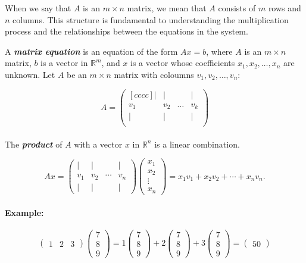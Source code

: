 \documentclass[a4paper,12pt]{article}
\begin{document}
When we say that \( A \) is an \( m \times n \) matrix, we mean that \( A \) consists of \( m \) rows and \( n \) columns. This structure is fundamental to understanding the multiplication process and the relationships between the equations in the system.
\begin{tcolorbox}[title=Definition,colframe=blue!70!black, colback=blue!5!white]
A \textbf{\textit{matrix equation}} is an equation of the form \(Ax = b\), where \(A\) is an \(m \times n\) matrix, \(b\) is a vector in \(\mathbb{R}^m\), and \(x\) is a vector whose coefficients \(x_1, x_2,\dots, x_n\) are unknown.
Let \(A\) be an \(m \times n\) matrix with coloumns \(v_1, v_2,\dots, v_n\):

\begin{equation} A =
  \begin{pmatrix}[cccc]
   | & | &  & | \\
   v_1 & v_2 & \dots & v_k \\
   | & | &  & |\\
\end{pmatrix}
\end{equation}
 \\
The \textit{\textbf{product}} of \(A\) with a vector \(x\) in \(\mathbb{R}^n\) is a linear combination.

\[
Ax =
\begin{pmatrix}
\vert & \vert & & \vert \\
v_1 & v_2 & \cdots & v_n \\
\vert & \vert & & \vert
\end{pmatrix}
\begin{pmatrix}
x_1 \\
x_2 \\
\vdots \\
x_n
\end{pmatrix}
=
x_1v_1 + x_2v_2 + \cdots + x_nv_n.
\]
\end{tcolorbox}
\paragraph{Example:}

\[
\begin{pmatrix}
1 & 2 & 3
\end{pmatrix}
 \begin{pmatrix}
7 \\
8 \\
9 
\end{pmatrix}  
=
1
 \begin{pmatrix}
7 \\
8 \\
9 
\end{pmatrix}  +
2
\begin{pmatrix}
7 \\
8 \\
9 
\end{pmatrix}  +
3
 \begin{pmatrix}
7 \\
8 \\
9 
\end{pmatrix}
=  \begin{pmatrix}
50
\end{pmatrix}
\]
\end{document}
